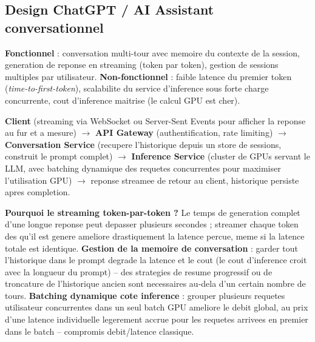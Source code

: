 \documentclass[11pt,a4paper]{article}
\newenvironment{sujet}[1]{%
  \subsection{#1}
}{%
  \bigskip
}
\begin{document}
\begin{sujet}{Design ChatGPT / AI Assistant conversationnel}

\begin{req}
\textbf{Fonctionnel} : conversation multi-tour avec memoire du contexte de la session, generation de reponse en streaming (token par token), gestion de sessions multiples par utilisateur. \textbf{Non-fonctionnel} : faible latence du premier token (\emph{time-to-first-token}), scalabilite du service d'inference sous forte charge concurrente, cout d'inference maitrise (le calcul GPU est cher).
\end{req}

\begin{archbox}
\textbf{Client} (streaming via WebSocket ou Server-Sent Events pour afficher la reponse au fur et a mesure) $\to$ \textbf{API Gateway} (authentification, rate limiting) $\to$ \textbf{Conversation Service} (recupere l'historique depuis un store de sessions, construit le prompt complet) $\to$ \textbf{Inference Service} (cluster de GPUs servant le LLM, avec batching dynamique des requetes concurrentes pour maximiser l'utilisation GPU) $\to$ reponse streamee de retour au client, historique persiste apres completion.
\end{archbox}

\begin{tradeoff}
\textbf{Pourquoi le streaming token-par-token ?} Le temps de generation complet d'une longue reponse peut depasser plusieurs secondes ; streamer chaque token des qu'il est genere ameliore drastiquement la latence percue, meme si la latence totale est identique. \textbf{Gestion de la memoire de conversation} : garder tout l'historique dans le prompt degrade la latence et le cout (le cout d'inference croit avec la longueur du prompt) -- des strategies de resume progressif ou de troncature de l'historique ancien sont necessaires au-dela d'un certain nombre de tours. \textbf{Batching dynamique cote inference} : grouper plusieurs requetes utilisateur concurrentes dans un seul batch GPU ameliore le debit global, au prix d'une latence individuelle legerement accrue pour les requetes arrivees en premier dans le batch -- compromis debit/latence classique.
\end{tradeoff}

\end{sujet}
\end{document}
